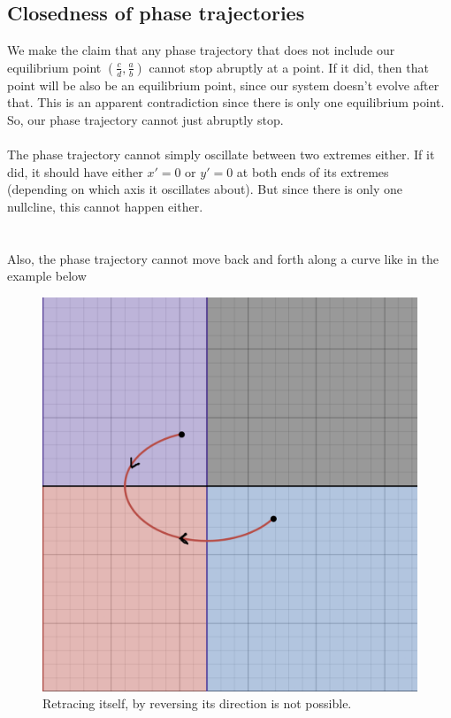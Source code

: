 \documentclass{article}
\begin{document}
\subsection{Closedness of phase trajectories}
We make the claim that any phase trajectory that does not include our equilibrium point $\left(\frac{c}{d}, \frac{a}{b} \right)$ cannot stop abruptly at a point. If it did, then that point will be also be an equilibrium point, since our system doesn't evolve after that. This is an apparent contradiction since there is only one equilibrium point. So, our phase trajectory cannot just abruptly stop.
\\
\\
The phase trajectory cannot simply oscillate between two extremes either. If it did, it should have either $x' = 0$ or $y' = 0$ at both ends of its extremes (depending on which axis it oscillates about). But since there is only one nullcline, this cannot happen either. 
\\
\\
\\
Also, the phase trajectory cannot move back and forth along a curve like in the example below\\
\begin{figure}[h]
    \centering
    \includegraphics[scale = 0.15]{reverse_direction.png}
        \caption{Retracing itself, by reversing its direction is not possible.}
    \label{fig:my_label}
\end{figure}
\end{document}
